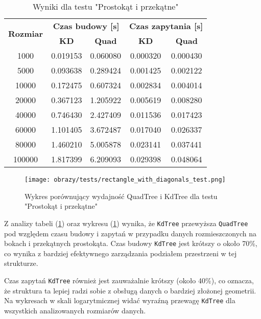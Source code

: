 \documentclass[12pt]{article}
\begin{document}
\begin{table}[h]
\centering
\caption{Wyniki dla testu "Prostokąt i przekątne"}
\label{tab:rectangle_with_diagonals}
\begin{tabular}{ccccc}
\toprule
\multirow{2}{*}{\textbf{Rozmiar}} & \multicolumn{2}{c}{\textbf{Czas budowy [s]}} & \multicolumn{2}{c}{\textbf{Czas zapytania [s]}} \\
\cmidrule(lr){2-3} \cmidrule(lr){4-5}
 & \textbf{KD} & \textbf{Quad} & \textbf{KD} & \textbf{Quad} \\
\midrule
1000   & 0.019153 & 0.060080 & 0.000320 & 0.000430 \\
5000   & 0.093638 & 0.289424 & 0.001425 & 0.002122 \\
10000  & 0.172475 & 0.607324 & 0.002834 & 0.004014 \\
20000  & 0.367123 & 1.205922 & 0.005619 & 0.008280 \\
40000  & 0.746430 & 2.427409 & 0.011536 & 0.017423 \\
60000  & 1.101405 & 3.672487 & 0.017040 & 0.026337 \\
80000  & 1.460210 & 5.005878 & 0.023141 & 0.037441 \\
100000 & 1.817399 & 6.209093 & 0.029398 & 0.048064 \\
\bottomrule
\end{tabular}
\end{table}


\begin{figure}[h]
    \centering
    \texttt{[image: obrazy/tests/rectangle\_with\_diagonals\_test.png]}
    \caption{Wykres porównujący wydajność QuadTree i KdTree dla testu "Prostokąt i przekątne"}
    \label{fig:rectangle_with_diagonals_tests}
\end{figure}
\newpage
\noindent Z analizy tabeli (\ref{tab:rectangle_with_diagonals}) oraz wykresu (\ref{fig:rectangle_with_diagonals_tests}) wynika, że \texttt{KdTree} przewyższa \texttt{QuadTree} pod względem czasu budowy i zapytań w przypadku danych rozmieszczonych na bokach i przekątnych prostokąta. Czas budowy \texttt{KdTree} jest krótszy o około 70\%, co wynika z bardziej efektywnego zarządzania podziałem przestrzeni w tej strukturze.

\noindent Czas zapytań \texttt{KdTree} również jest zauważalnie krótszy (około 40\%), co oznacza, że struktura ta lepiej radzi sobie z obsługą danych o bardziej złożonej geometrii. Na wykresach w skali logarytmicznej widać wyraźną przewagę \texttt{KdTree} dla wszystkich analizowanych rozmiarów danych.
\end{document}
